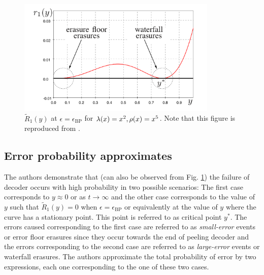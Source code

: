 \begin{figure}[!ht]
\centering
\includegraphics[width=0.85\textwidth]{data/UMAC/Figures/small_large_Erasures.png}
\caption{$\tilde{R}_{1}(y)$ at $\epsilon=\epsilon_{\text{BP}}$ for $\lambda(x)=x^2,\rho(x)=x^5$. Note that this figure is reproduced from \cite{amraoui2007find}.}
\label{Fig:LDPCResidual}
\end{figure}

\subsection{Error probability approximates}
 The authors \cite{amraoui2007find} demonstrate that (can also be observed from Fig. \ref{Fig:LDPCResidual}) the failure of decoder occurs with high probability in two possible scenarios: The first case corresponds to $y\approx 0$ or as $t\rightarrow \infty$ and the other case corresponds to the value of $y$ such that $\tilde{R}_{1}(y)=0$ when $\epsilon=\epsilon_{\text{BP}}$ or equivalently at the value of $y$ where the curve has a stationary point. This point is referred to as critical point $y^*.$ The errors caused corresponding to the first case are referred to as \textit{small-error} events or error floor erasures since they occur towards the end of peeling decoder and the errors corresponding to the second case are referred to as \textit{large-error} events or waterfall erasures. The authors approximate the total probability of error by two expressions, each one corresponding to the one of these two cases.
 

